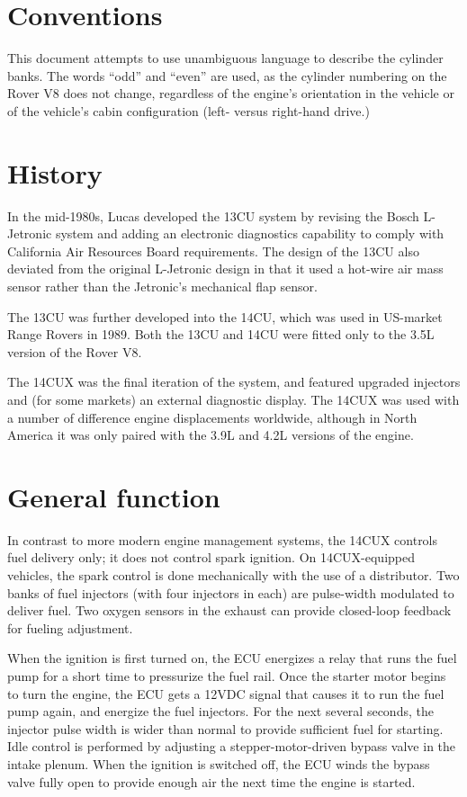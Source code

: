 \documentclass[11pt,twocolumn]{scrartcl}
\begin{document}
\section {Conventions}
This document attempts to use unambiguous language to describe the cylinder banks. The words ``odd'' and ``even'' are used, as the cylinder numbering on the Rover V8 does not change, regardless of the engine's orientation in the vehicle or of the vehicle's cabin configuration (left- versus right-hand drive.)

\section {History}
In the mid-1980s, Lucas developed the 13CU system by revising the Bosch L-Jetronic system and adding an electronic diagnostics capability to comply with California Air Resources Board requirements. The design of the 13CU also deviated from the original L-Jetronic design in that it used a hot-wire air mass sensor rather than the Jetronic's mechanical flap sensor.

The 13CU was further developed into the 14CU, which was used in US-market Range Rovers in 1989. Both the 13CU and 14CU were fitted only to the 3.5L version of the Rover V8.

The 14CUX was the final iteration of the system, and featured upgraded injectors and (for some markets) an external diagnostic display. The 14CUX was used with a number of difference engine displacements worldwide, although in North America it was only paired with the 3.9L and 4.2L versions of the engine.

\section {General function}
In contrast to more modern engine management systems, the 14CUX controls fuel delivery only; it does not control spark ignition. On 14CUX-equipped vehicles, the spark control is done mechanically with the use of a distributor. Two banks of fuel injectors (with four injectors in each) are pulse-width modulated to deliver fuel. Two oxygen sensors in the exhaust can provide closed-loop feedback for fueling adjustment.

When the ignition is first turned on, the ECU energizes a relay that runs the fuel pump for a short time to pressurize the fuel rail. Once the starter motor begins to turn the engine, the ECU gets a 12VDC signal that causes it to run the fuel pump again, and energize the fuel injectors. For the next several seconds, the injector pulse width is wider than normal to provide sufficient fuel for starting. Idle control is performed by adjusting a stepper-motor-driven bypass valve in the intake plenum. When the ignition is switched off, the ECU winds the bypass valve fully open to provide enough air the next time the engine is started.
\end{document}
